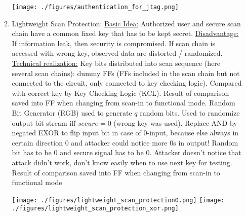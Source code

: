 \documentclass[landscape, a4paper]{article}
\begin{document}
\begin{minipage}[t]{0.2\linewidth}
\begin{betterlist}
\begin{enumerate}
\begin{enumerate}
				\texttt{[image: ./figures/authentication\_for\_jtag.png]}
				\item \alert{Lightweight Scan Protection:} \underline{Basic Idea:} Authorized user and secure scan chain have a common fixed key that has to be kept secret. \underline{Disadvantage:} If information leak, then security is compromised. If scan chain is accessed with wrong key, observed data are distorted / randomized. \underline{Technical realization:} Key bits distributed into scan sequence (here several scan chains): dummy FFs (FFs included in the scan chain but not connected to the circuit, only connected to key checking logic). Compared with correct key by Key Checking Logic (KCL). Result of comparison saved into FF when changing from scan-in to functional mode. Random Bit Generator (RGB) used to generate $q$ random bits. Used to randomize output bit stream iff $secure = 0$ (wrong key was used). Replace AND by negated EXOR to flip input bit in case of $0$-input, because else always in certain direction $0$ and attacker could notice more $0$s in output! Random bit has to be $0$ and secure signal has to be $0$. Attacker doesn't notice that attack didn't work, don't know easily when to use next key for testing. Result of comparison saved into FF when changing from scan-in to functional mode

				\texttt{[image: ./figures/lightweight\_scan\_protection0.png]}
				\texttt{[image: ./figures/lightweight\_scan\_protection\_xor.png]}


\end{enumerate}
\end{enumerate}
\end{betterlist}
\end{minipage}
\end{document}
